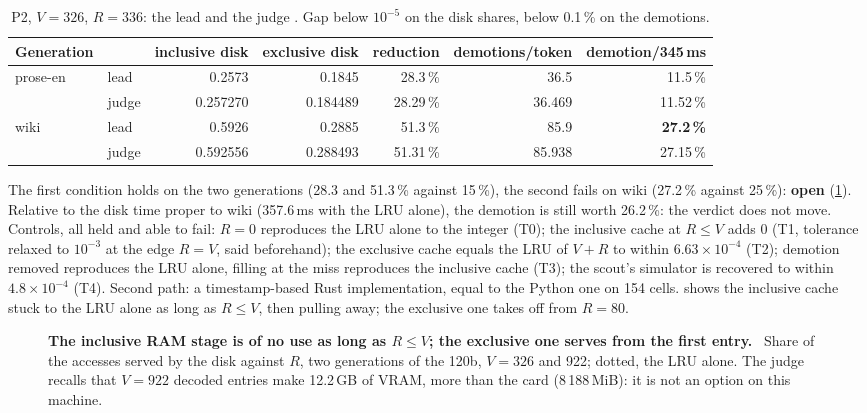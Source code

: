 \begin{table}[tbp]
\centering\small
\caption[P2: the verdict]{P2, $V = 326$, $R = 336$: the lead and the judge \mes. Gap below $10^{-5}$ on the disk shares, below 0.1\,\% on the demotions.}
\label{t3mim:tab:p2}
\begin{tabular}{@{}llrrrrr@{}}
\toprule
Generation & & inclusive disk & exclusive disk & reduction & demotions/token & demotion/345\,ms \\
\midrule
prose-en & lead & 0.2573 & 0.1845 & 28.3\,\% & 36.5 & 11.5\,\% \\
 & judge & 0.257270 & 0.184489 & 28.29\,\% & 36.469 & 11.52\,\% \\
wiki & lead & 0.5926 & 0.2885 & 51.3\,\% & 85.9 & \textbf{27.2\,\%} \\
 & judge & 0.592556 & 0.288493 & 51.31\,\% & 85.938 & 27.15\,\% \\
\bottomrule
\end{tabular}
\end{table}

The first condition holds on the two generations (28.3 and 51.3\,\% against 15\,\%), the second fails on wiki (27.2\,\% against 25\,\%): \textbf{open} (\cref{t3mim:tab:p2}). Relative to the disk time proper to wiki (357.6\,ms with the LRU alone), the demotion is still worth 26.2\,\%: the verdict does not move. Controls, all held and able to fail: $R = 0$ reproduces the LRU alone to the integer (T0); the inclusive cache at $R \le V$ adds 0 (T1, tolerance relaxed to $10^{-3}$ at the edge $R = V$, said beforehand); the exclusive cache equals the LRU of $V+R$ to within $6.63 \times 10^{-4}$ (T2); demotion removed reproduces the LRU alone, filling at the miss reproduces the inclusive cache (T3); the scout's simulator is recovered to within $4.8 \times 10^{-4}$ (T4). Second path: a timestamp-based Rust implementation, equal to the Python one on 154 cells.  shows the inclusive cache stuck to the LRU alone as long as $R \le V$, then pulling away; the exclusive one takes off from $R = 80$.

\begin{figure}[tbp]
\centering
{}
\caption[P2: disk share against the size of the RAM]{\textbf{The inclusive RAM stage is of no use as long as $R \le V$; the exclusive one serves from the first entry.} \mes~Share of the accesses served by the disk against $R$, two generations of the 120b, $V = 326$ and 922; dotted, the LRU alone. The judge recalls that $V = 922$ decoded entries make 12.2\,GB of VRAM, more than the card (8\,188\,MiB): it is not an option on this machine. \HorsStyle{}}
\label{fig:t3-mim-p2-disque}
\end{figure}

